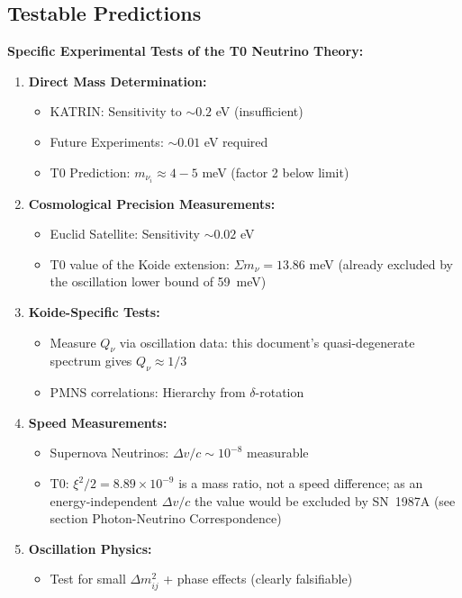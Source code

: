 	\subsection{Testable Predictions}
	
	\begin{experimental}
		\textbf{Specific Experimental Tests of the T0 Neutrino Theory:}
		
		\begin{enumerate}
			\item \textbf{Direct Mass Determination:}
			\begin{itemize}
				\item KATRIN: Sensitivity to $\sim 0.2$ eV (insufficient)
				\item Future Experiments: $\sim 0.01$ eV required
				\item T0 Prediction: $m_{\nu_i} \approx 4-5$ meV (factor 2 below limit)
			\end{itemize}
			
			\item \textbf{Cosmological Precision Measurements:}
			\begin{itemize}
				\item Euclid Satellite: Sensitivity $\sim 0.02$ eV
				\item T0 value of the Koide extension: $\Sigma m_\nu = 13.86$ meV (already excluded by the oscillation lower bound of 59~meV)
			\end{itemize}
			
			\item \textbf{Koide-Specific Tests:}
			\begin{itemize}
				\item Measure $Q_\nu$ via oscillation data: this document's quasi-degenerate spectrum gives $Q_\nu \approx 1/3$
				\item PMNS correlations: Hierarchy from $\delta$-rotation
			\end{itemize}
			
			\item \textbf{Speed Measurements:}
			\begin{itemize}
				\item Supernova Neutrinos: $\Delta v/c \sim 10^{-8}$ measurable
				\item T0: $\xi^2/2 = 8.89 \times 10^{-9}$ is a mass ratio, not a speed difference; as an energy-independent $\Delta v/c$ the value would be excluded by SN~1987A (see section Photon-Neutrino Correspondence)
			\end{itemize}
			
			\item \textbf{Oscillation Physics:}
			\begin{itemize}
				\item Test for small $\Delta m^2_{ij}$ + phase effects (clearly falsifiable)
			\end{itemize}
		\end{enumerate}
	\end{experimental}
	

